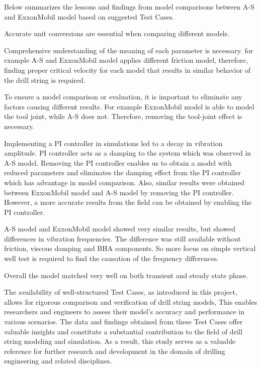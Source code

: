 Below summarizes the lessons and findings from model comparisons between A-S and ExxonMobil model based on suggested Test Cases.
\begin{bulletedlist}
    \item Accurate unit conversions are essential when comparing different models.
    \item Comprehensive understanding of the meaning of each parameter is necessary. for example A-S and ExxonMobil model applies different friction model, therefore, finding proper critical velocity for each model that results in similar behavior of the drill string is required.
    \item To ensure a model comparison or evaluation, it is important to eliminate any factors causing different results. For example ExxonMobil model is able to model the tool joint, while A-S does not. Therefore, removing the tool-joint effect is necessary.
    \item Implementing a PI controller in simulations led to a decay in vibration amplitude. PI controller acts as a damping to the system which was observed in A-S model. Removing the PI controller enables us to obtain a model with reduced parameters and eliminates the damping effect from the PI controller which has advantage in model comparison. Also, similar results were obtained between ExxonMobil model and A-S model by removing the PI controller. However, a more accurate results from the field can be obtained by enabling the PI controller.
    \item A-S model and ExxonMobil model showed very similar results, but showed differences in vibration frequencies. The difference was still available without friction, viscous damping and BHA components. So more focus on simple vertical well test is required to find the causation of the frequency differences.
    \item Overall the model matched very well on both transient and steady state phase.
\end{bulletedlist}

The availability of well-structured Test Cases, as introduced in this project, allows for rigorous comparison and verification of drill string models, This enables researchers and engineers to assess their model's accuracy and performance in various scenarios. The data and findings obtained from these Test Cases offer valuable insights and constitute a substantial contribution to the field of drill string modeling and simulation. As a result, this study serves as a valuable reference for further research and development in the domain of drilling engineering and related disciplines.




